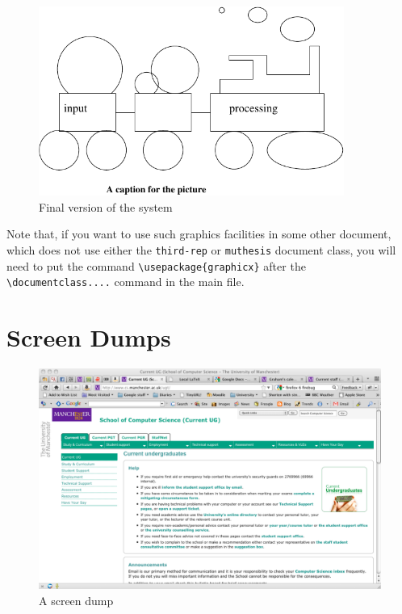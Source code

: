 \begin{figure}
\begin{center}
\includegraphics[width=10cm]{figure1} %
\end{center}
\caption{Final version of the system}
\label{fig:fig-eg}  
\end{figure}

Note that, if you want to use such graphics facilities in some other
document, which does not use either the \texttt{third-rep} or
\texttt{muthesis} document class, you will need to put the command
\verb=\usepackage{graphicx}= after the \verb=\documentclass....=
command in the main file.

\section{Screen Dumps}
\label{sec:screen-dumps}
\begin{figure}
\begin{center}
\includegraphics[width=12cm]{screen}
\end{center}
\caption{A screen dump}
\label{fig:scr-dump}
\end{figure}

